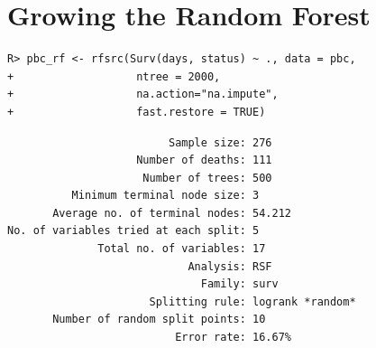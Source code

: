 \documentclass[nojss]{jss}
\begin{document}

\section{Growing the Random Forest}
\begin{knitrout}\footnotesize
{}\color{fgcolor}\begin{kframe}
\begin{verbatim}
R> pbc_rf <- rfsrc(Surv(days, status) ~ ., data = pbc, 
+                   ntree = 2000,
+                   na.action="na.impute", 
+                   fast.restore = TRUE)
\end{verbatim}
\end{kframe}
\end{knitrout}

\begin{knitrout}\footnotesize
{}\color{fgcolor}\begin{kframe}
\begin{verbatim}
                         Sample size: 276
                    Number of deaths: 111
                     Number of trees: 500
          Minimum terminal node size: 3
       Average no. of terminal nodes: 54.212
No. of variables tried at each split: 5
              Total no. of variables: 17
                            Analysis: RSF
                              Family: surv
                      Splitting rule: logrank *random*
       Number of random split points: 10
                          Error rate: 16.67%
\end{verbatim}
\end{kframe}
\end{knitrout}
\end{document}
